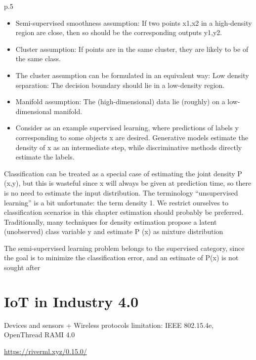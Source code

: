 \cite{chapelle_semi-supervised_2006}
p.5
\begin{itemize}
\item Semi-supervised smoothness assumption: If two points x1,x2 in a high-density region are close, then so should be the corresponding outputs y1,y2. 
\item Cluster assumption: If points are in the same cluster, they are likely to be of the same class.
\item The cluster assumption can be formulated in an equivalent way: Low density separation: The decision boundary should lie in a low-density region.
\item Manifold assumption: The (high-dimensional) data lie (roughly) on a low-dimensional manifold.
\item Consider as an example supervised learning, where predictions of labels y corresponding to some objects x are desired. Generative models estimate the density of x as an intermediate step, while discriminative methods directly estimate the labels.
\end{itemize} 

Classification can be treated as a special case of estimating the joint density P (x,y), but this is wasteful since x will always be given at prediction time, so there is no need to estimate the input distribution. The terminology “unsupervised learning” is a bit unfortunate: the term density 1. We restrict ourselves to classification scenarios in this chapter estimation should probably be preferred. Traditionally, many techniques for density estimation propose a latent (unobserved) class variable y and estimate P (x) as mixture distribution

The semi-supervised learning problem belongs to the supervised category, since the goal is to minimize the classification error, and an estimate of P(x) is not sought after

\section{IoT in Industry 4.0}
	Devices and sensors + Wireless protocols limitation: IEEE 802.15.4e, OpenThread
	RAMI 4.0 \cite{torres_automatic_2022}
	

\url{https://riverml.xyz/0.15.0/}